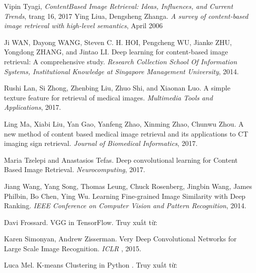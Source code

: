 \documentclass[a4paper,14pt]{extreport}
\begin{document}
\begin{thebibliography}{9}
Vipin Tyagi, \textit{ContentBased Image Retrieval: Ideas, Influences, and Current Trends}, trang 16, 2017
Ying Liua, Dengsheng Zhanga. \textit{A survey of content-based image retrieval with high-level semantics},  April 2006

Ji WAN, Dayong WANG, Steven C. H. HOI, Pengcheng WU, Jianke ZHU, Yongdong ZHANG, and Jintao LI.
Deep learning for content-based image retrieval: A comprehensive study.
\textit{Research Collection School Of Information Systems, Institutional Knowledge at Singapore Management University}, 2014.
 
Rushi Lan, Si Zhong, Zhenbing Liu, Zhuo Shi, and Xiaonan Luo.
A simple texture feature for retrieval of medical images.
\textit{Multimedia Tools and Applications}, 2017.
 
Ling Ma, Xiabi Liu, Yan Gao, Yanfeng Zhao, Xinming Zhao, Chunwu Zhou. A new method of content based medical image retrieval and its applications to CT imaging sign retrieval.
\textit{Journal of Biomedical Informatics}, 2017.

Maria Tzelepi and Anastasios Tefas. Deep convolutional learning for Content Based Image Retrieval.
\textit{Neurocomputing}, 2017.

Jiang Wang, Yang Song, Thomas Leung, Chuck Rosenberg, Jingbin Wang, James Philbin, Bo Chen, Ying Wu. Learning Fine-grained Image Similarity with Deep Ranking.
\textit{IEEE Conference on Computer Vision and Pattern Recognition}, 2014.

Davi Frossard. VGG in TensorFlow. Truy xuất từ: \texttt{}

Karen Simonyan, Andrew Zisserman. Very Deep Convolutional Networks for Large Scale Image Recognition.
\textit{ ICLR }, 2015.

Luca Mel. K-means Clustering in Python . Truy xuất từ: \texttt{}

\end{thebibliography}
\end{document}
